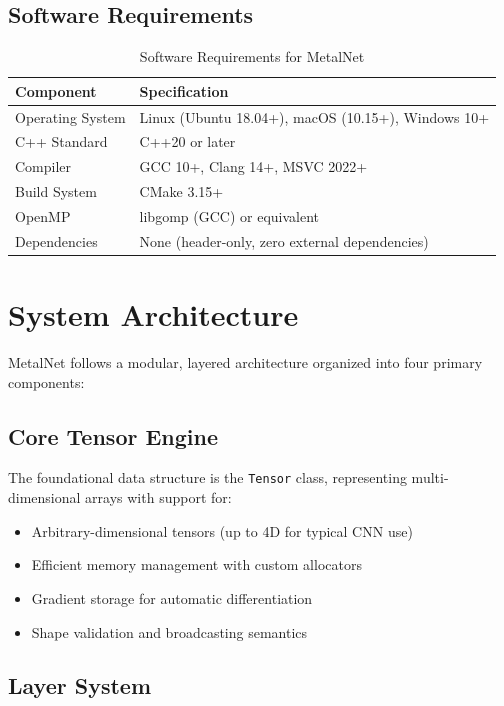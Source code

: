 \documentclass[12pt,oneside,a4paper]{report}
\begin{document}
\subsection{Software Requirements}

\begin{table}[H]
\centering
\caption{Software Requirements for MetalNet}
\begin{tabular}{|l|l|}
\hline
\textbf{Component} & \textbf{Specification} \\
\hline
Operating System & Linux (Ubuntu 18.04+), macOS (10.15+), Windows 10+ \\
C++ Standard & C++20 or later \\
Compiler & GCC 10+, Clang 14+, MSVC 2022+ \\
Build System & CMake 3.15+ \\
OpenMP & libgomp (GCC) or equivalent \\
Dependencies & None (header-only, zero external dependencies) \\
\hline
\end{tabular}
\end{table}

\section{System Architecture}

MetalNet follows a modular, layered architecture organized into four primary components:

\subsection{Core Tensor Engine}

The foundational data structure is the \texttt{Tensor} class, representing multi-dimensional arrays with support for:
\begin{itemize}
    \item Arbitrary-dimensional tensors (up to 4D for typical CNN use)
    \item Efficient memory management with custom allocators
    \item Gradient storage for automatic differentiation
    \item Shape validation and broadcasting semantics
\end{itemize}

\subsection{Layer System}
\end{document}
